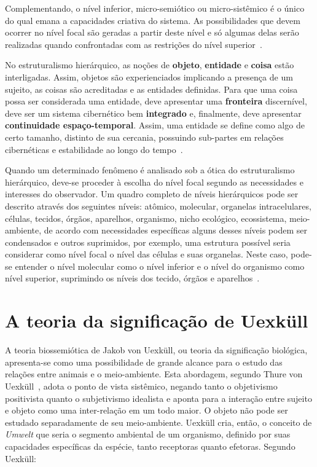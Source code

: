 Complementando, o nível inferior, micro-semiótico ou micro-sistêmico é o único do qual emana a capacidades criativa do sistema. As possibilidades que devem ocorrer no nível focal são geradas a partir deste nível e só algumas delas serão realizadas quando confrontadas com as restrições do nível superior~\cite{salthe85}.

No estruturalismo hierárquico, as noções de \textbf{objeto}, \textbf{entidade} e \textbf{coisa} estão interligadas. Assim, objetos são experienciados implicando a presença de um sujeito, as coisas são acreditadas e as entidades definidas. Para que uma coisa possa ser considerada uma entidade, deve apresentar uma \textbf{fronteira} discernível, deve ser um sistema cibernético bem \textbf{integrado} e, finalmente, deve apresentar \textbf{continuidade espaço-temporal}. Assim, uma entidade se define como algo de certo tamanho, distinto de sua cercania, possuindo sub-partes em relações cibernéticas e estabilidade ao longo do tempo~\cite{salthe85}.

Quando um determinado fenômeno é analisado sob a ótica do estruturalismo hierárquico, deve-se proceder à escolha do nível focal segundo as necessidades e interesses do observador. Um quadro completo de níveis hierárquicos pode ser descrito através dos seguintes níveis: atômico, molecular, organelas intracelulares, células, tecidos, órgãos, aparelhos, organismo, nicho ecológico, ecossistema, meio-ambiente, de acordo com necessidades específicas alguns desses níveis podem ser condensados e outros suprimidos, por exemplo, uma estrutura possível seria considerar como nível focal o nível das células e suas organelas. Neste caso, pode-se entender o nível molecular como o nível inferior e o nível do organismo como nível superior, suprimindo os níveis dos tecido, órgãos e aparelhos~\cite{salthe85}.

\section{A teoria da significação de Uexküll}

A teoria biossemiótica de Jakob von Uexküll, ou teoria da significação biológica, apresenta-se como uma possibilidade de grande alcance para o estudo das relações entre animais e o meio-ambiente. Esta abordagem, segundo Thure von Uexküll~\cite{thure04}, adota o ponto de vista sistêmico, negando tanto o objetivismo positivista quanto o subjetivismo idealista e aponta para a interação entre sujeito e objeto como  uma inter-relação em um todo maior.  O  objeto não pode ser estudado separadamente de seu meio-ambiente. Uexküll cria, então, o conceito de \textit{Umwelt} que seria o segmento ambiental de um organismo, definido por suas capacidades específicas da espécie, tanto receptoras quanto efetoras. Segundo Uexküll:

